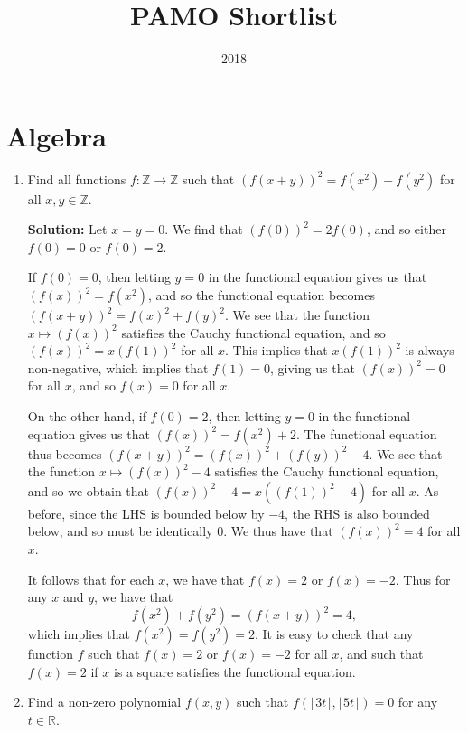 \documentclass{article}
\title{PAMO Shortlist}
\author{}
\date{2018}
\newcommand{\solution}[1]{%
\ifsolutions%
    \textbf{Solution: } #1
\fi
}
\begin{document}
\maketitle

\section{Algebra}
\begin{enumerate}

\item Find all functions $f : \mathbb{Z} \to \mathbb{Z}$ such that ${(f(x + y))}^2 = f(x^2) + f(y^2)$ for all $x, y \in \mathbb{Z}$.

\solution{Let $x = y = 0$. We find that ${(f(0))}^2 = 2f(0)$, and so either $f(0) = 0$ or $f(0) = 2$.

If $f(0) = 0$, then letting $y = 0$ in the functional equation gives us that ${(f(x))}^2 = f(x^2)$, and so the functional equation becomes ${(f(x + y))}^2 = {f(x)}^2 + {f(y)}^2$. We see that the function $x \mapsto {(f(x))}^2$ satisfies the Cauchy functional equation, and so ${(f(x))}^2 = x{(f(1))}^2$ for all $x$. This implies that $x{(f(1))}^2$ is always non-negative, which implies that $f(1) = 0$, giving us that ${(f(x))}^2 = 0$ for all $x$, and so $f(x) = 0$ for all $x$.

On the other hand, if $f(0) = 2$, then letting $y = 0$ in the functional equation gives us that ${(f(x))}^2 = f(x^2) + 2$. The functional equation thus becomes ${(f(x + y))}^2  = {(f(x))}^2 + {(f(y))}^2 - 4$. We see that the function $x \mapsto {(f(x))}^2 - 4$ satisfies the Cauchy functional equation, and so we obtain that ${(f(x))}^2 - 4 = x({(f(1))}^2 - 4)$ for all $x$. As before, since the LHS is bounded below by $-4$, the RHS is also bounded below, and so must be identically $0$. We thus have that ${(f(x))}^2 = 4$ for all $x$.

It follows that for each $x$, we have that $f(x) = 2$ or $f(x) = -2$. Thus for any $x$ and $y$, we have that
\[
    f(x^2) + f(y^2) = {(f(x + y))}^2 = 4,
\]
which implies that $f(x^2) = f(y^2) = 2$. It is easy to check that any function $f$ such that $f(x) = 2$ or $f(x) = -2$ for all $x$, and such that $f(x) = 2$ if $x$ is a square satisfies the functional equation.}

\item Find a non-zero polynomial $f(x, y)$ such that $f(\lfloor 3t \rfloor, \lfloor 5t \rfloor) = 0$ for any $t \in \mathbb{R}$.


\end{enumerate}
\end{document}
